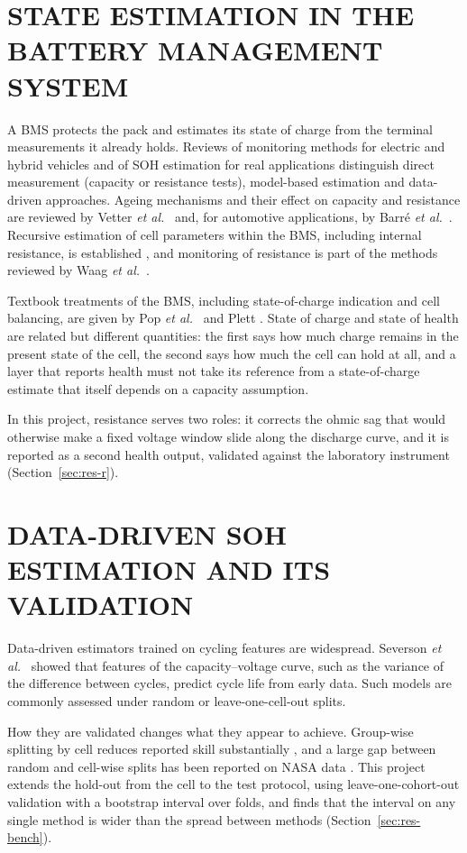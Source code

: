 \documentclass[12pt,a4paper]{amritareport}
\begin{document}
\section{STATE ESTIMATION IN THE BATTERY MANAGEMENT SYSTEM}

A BMS protects the pack and estimates its state of charge from the terminal measurements it already holds. Reviews of monitoring methods for electric and hybrid vehicles \cite{waag2014} and of SOH estimation for real applications \cite{berecibar2016} distinguish direct measurement (capacity or resistance tests), model-based estimation and data-driven approaches. Ageing mechanisms and their effect on capacity and resistance are reviewed by Vetter \emph{et al.}\ \cite{vetter2005} and, for automotive applications, by Barr\'e \emph{et al.}\ \cite{barre2013}. Recursive estimation of cell parameters within the BMS, including internal resistance, is established \cite{plett2004}, and monitoring of resistance is part of the methods reviewed by Waag \emph{et al.}\ \cite{waag2014}.

Textbook treatments of the BMS, including state-of-charge indication and cell balancing, are given by Pop \emph{et al.}\ \cite{pop2008} and Plett \cite{plett2015}. State of charge and state of health are related but different quantities: the first says how much charge remains in the present state of the cell, the second says how much the cell can hold at all, and a layer that reports health must not take its reference from a state-of-charge estimate that itself depends on a capacity assumption.

In this project, resistance serves two roles: it corrects the ohmic sag that would otherwise make a fixed voltage window slide along the discharge curve, and it is reported as a second health output, validated against the laboratory instrument (Section~\ref{sec:res-r}).

\section{DATA-DRIVEN SOH ESTIMATION AND ITS VALIDATION}

Data-driven estimators trained on cycling features are widespread. Severson \emph{et al.}\ \cite{severson2019} showed that features of the capacity--voltage curve, such as the variance of the difference between cycles, predict cycle life from early data. Such models are commonly assessed under random or leave-one-cell-out splits.

How they are validated changes what they appear to achieve. Group-wise splitting by cell reduces reported skill substantially \cite{maher2025}, and a large gap between random and cell-wise splits has been reported on NASA data \cite{le2026}. This project extends the hold-out from the cell to the test protocol, using leave-one-cohort-out validation with a bootstrap interval over folds, and finds that the interval on any single method is wider than the spread between methods (Section~\ref{sec:res-bench}).
\end{document}
